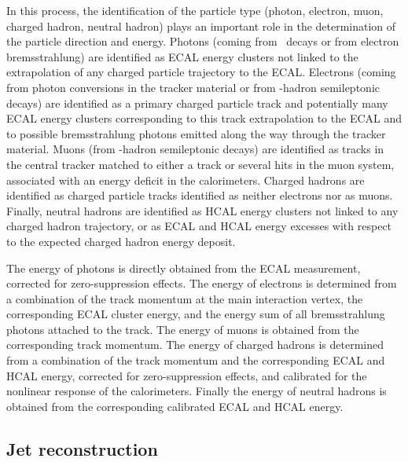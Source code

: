 In this process, the identification of the particle type (photon, electron, muon, charged hadron, neutral hadron) plays an important role in the determination of the particle direction and energy. Photons (\eg coming from \Pgpz\ decays or from electron bremsstrahlung) are identified as ECAL energy clusters not linked to the extrapolation of any charged particle trajectory to the ECAL. Electrons (\eg coming from photon conversions in the tracker material or from \cPqb-hadron semileptonic decays) are identified as a primary charged particle track and potentially many ECAL energy clusters corresponding to this track extrapolation to the ECAL and to possible bremsstrahlung photons emitted along the way through the tracker material. Muons (\eg from \cPqb-hadron semileptonic decays) are identified as tracks in the central tracker matched to either a track or several hits in the muon system, associated with an energy deficit in the calorimeters. Charged hadrons are identified as charged particle tracks identified as neither electrons nor as muons. Finally, neutral hadrons are identified as HCAL energy clusters not linked to any charged hadron trajectory, or as ECAL and HCAL energy excesses with respect to the expected charged hadron energy deposit. 

The energy of photons is directly obtained from the ECAL measurement, corrected for zero-suppression effects. The energy of electrons is determined from a combination of the track momentum at the main interaction vertex, the corresponding ECAL cluster energy, and the energy sum of all bremsstrahlung photons attached to the track. The energy of muons is obtained from the corresponding track momentum. The energy of charged hadrons is determined from a combination of the track momentum and the corresponding ECAL and HCAL energy, corrected for zero-suppression effects, and calibrated for the nonlinear response of the calorimeters. Finally the energy of neutral hadrons is obtained from the corresponding calibrated ECAL and HCAL energy. 

\subsection{Jet reconstruction}

